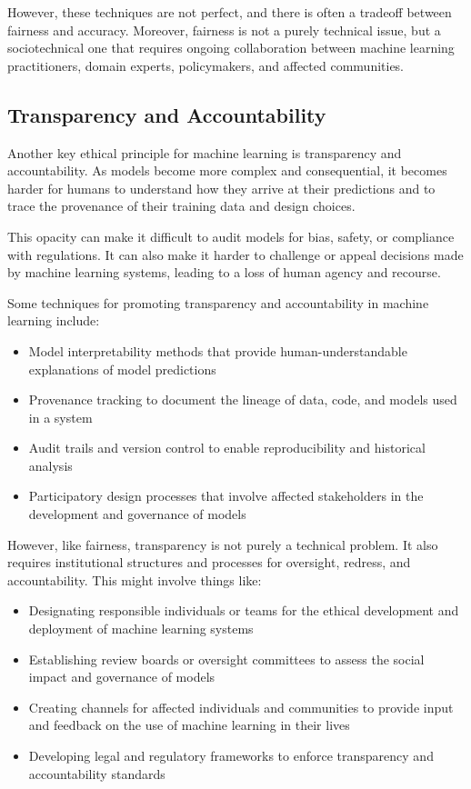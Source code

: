 \documentclass[
  9pt,
  letterpaper,
  abstract,
  titlepage]{scrbook}
\begin{document}
However, these techniques are not perfect, and there is often a tradeoff
between fairness and accuracy. Moreover, fairness is not a purely
technical issue, but a sociotechnical one that requires ongoing
collaboration between machine learning practitioners, domain experts,
policymakers, and affected communities.

\subsection{Transparency and
Accountability}\label{transparency-and-accountability}

Another key ethical principle for machine learning is transparency and
accountability. As models become more complex and consequential, it
becomes harder for humans to understand how they arrive at their
predictions and to trace the provenance of their training data and
design choices.

This opacity can make it difficult to audit models for bias, safety, or
compliance with regulations. It can also make it harder to challenge or
appeal decisions made by machine learning systems, leading to a loss of
human agency and recourse.

Some techniques for promoting transparency and accountability in machine
learning include:

\begin{itemize}
\item
  Model interpretability methods that provide human-understandable
  explanations of model predictions
\item
  Provenance tracking to document the lineage of data, code, and models
  used in a system
\item
  Audit trails and version control to enable reproducibility and
  historical analysis
\item
  Participatory design processes that involve affected stakeholders in
  the development and governance of models
\end{itemize}

However, like fairness, transparency is not purely a technical problem.
It also requires institutional structures and processes for oversight,
redress, and accountability. This might involve things like:

\begin{itemize}
\item
  Designating responsible individuals or teams for the ethical
  development and deployment of machine learning systems
\item
  Establishing review boards or oversight committees to assess the
  social impact and governance of models
\item
  Creating channels for affected individuals and communities to provide
  input and feedback on the use of machine learning in their lives
\item
  Developing legal and regulatory frameworks to enforce transparency and
  accountability standards
\end{itemize}
\end{document}
